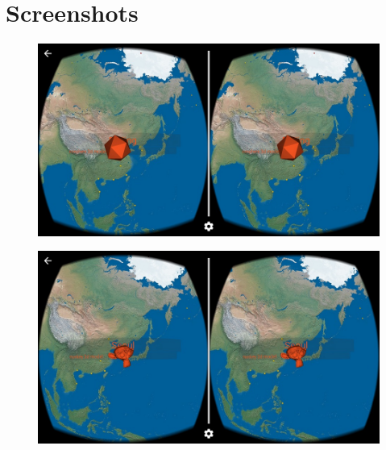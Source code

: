 \label{appendix-screenshots}
\chapter{Screenshots}

\begin{figure}[H]
	\centering
	\includegraphics[width=\linewidth, keepaspectratio]{Figures/Screenshots/device-2016-10-28-012222.jpg}
	\decoRule
\end{figure}

\begin{figure}[H]
	\centering
	\includegraphics[width=\linewidth, keepaspectratio]{Figures/Screenshots/device-2016-10-28-012239.jpg}
	\decoRule
\end{figure}

